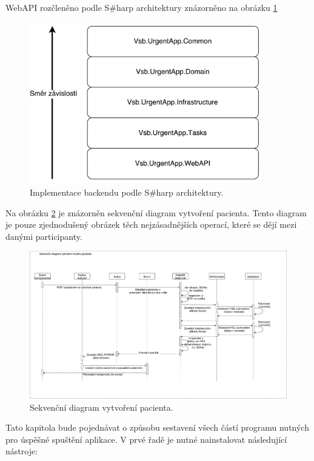 WebAPI rozčleněno podle S\#harp architektury znázorněno na obrázku \ref{fig:WebAPISolution}

\begin{figure} [H]
	\centering
	\includegraphics[width=10cm]{../WebAPISolution.pdf}
	\caption{Implementace backendu podle S\#harp architektury.}
	\label{fig:WebAPISolution}
\end{figure}

Na obrázku \ref{fig:SequenceDiagram} je znázorněn sekvenční diagram vytvoření pacienta. Tento diagram je pouze zjednodušený obrázek těch nejzásadnějších operací, které se dějí mezi danými participanty. \\

\begin{figure}
	\includegraphics[width=22cm]{../SequenceDiagram.pdf}
	\caption{Sekvenční diagram vytvoření pacienta.}
	\label{fig:SequenceDiagram}
\end{figure}


Tato kapitola bude pojednávat o způsobu sestavení všech částí programu nutných pro úspěšné spuštění aplikace. V prvé řadě je nutné nainstalovat následující nástroje:

